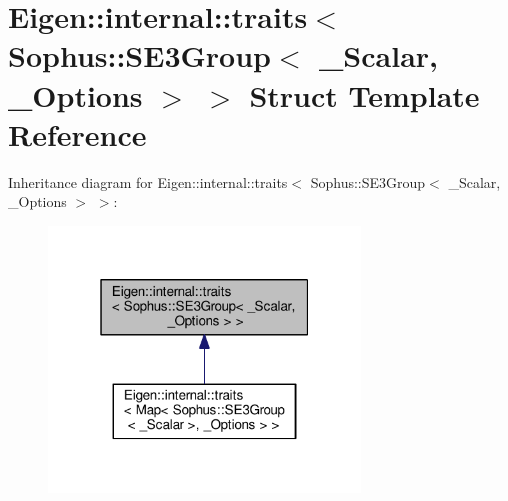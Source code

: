 \hypertarget{struct_eigen_1_1internal_1_1traits_3_01_sophus_1_1_s_e3_group_3_01___scalar_00_01___options_01_4_01_4}{}\section{Eigen\+:\+:internal\+:\+:traits$<$ Sophus\+:\+:S\+E3\+Group$<$ \+\_\+\+Scalar, \+\_\+\+Options $>$ $>$ Struct Template Reference}
\label{struct_eigen_1_1internal_1_1traits_3_01_sophus_1_1_s_e3_group_3_01___scalar_00_01___options_01_4_01_4}


Inheritance diagram for Eigen\+:\+:internal\+:\+:traits$<$ Sophus\+:\+:S\+E3\+Group$<$ \+\_\+\+Scalar, \+\_\+\+Options $>$ $>$\+:
\nopagebreak
\begin{figure}[H]
\begin{center}
\leavevmode
\includegraphics[width=235pt]{struct_eigen_1_1internal_1_1traits_3_01_sophus_1_1_s_e3_group_3_01___scalar_00_01___options_01_4_01_4__inherit__graph}
\end{center}
\end{figure}
